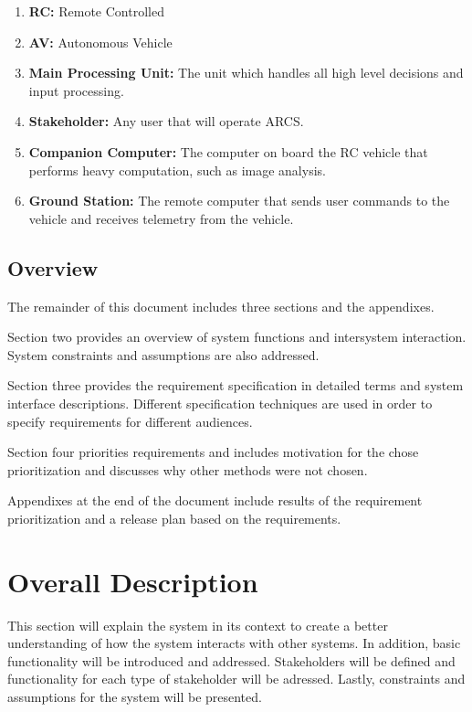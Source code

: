 \documentclass[compsoc,draftclsnofoot,onecolumn,10pt]{IEEEtran}
\begin{document}
\begin{enumerate}
	\item \textbf{RC:} Remote Controlled
	\item \textbf{AV:} Autonomous Vehicle
	\item \textbf{Main Processing Unit:} The unit which handles all high level decisions and input processing. 
	\item \textbf{Stakeholder:} Any user that will operate ARCS.
	\item \textbf{Companion Computer:} The computer on board the RC vehicle that performs heavy computation, such as image analysis.
	\item \textbf{Ground Station:} The remote computer that sends user commands to the vehicle and receives telemetry from the vehicle.
\end{enumerate}





\subsection{Overview} %
The remainder of this document includes three sections and the appendixes. \par
Section two provides an overview of system functions and intersystem interaction. 
System constraints and assumptions are also addressed. \par
Section three provides the requirement specification in detailed terms and system interface descriptions. Different specification techniques are used in order to specify requirements for different audiences. \par
Section four priorities requirements and includes motivation for the chose prioritization and discusses why other methods were not chosen. \par
Appendixes at the end of the document include results of the requirement prioritization and a release plan based on the requirements. \cite{IEEE830}

\section{Overall Description} %
This section will explain the system in its context to create a better understanding of how the system interacts with other systems.
In addition, basic functionality will be introduced and addressed. 
Stakeholders will be defined and functionality for each type of stakeholder will be adressed. 
Lastly, constraints and assumptions for the system will be presented. 
\end{document}
